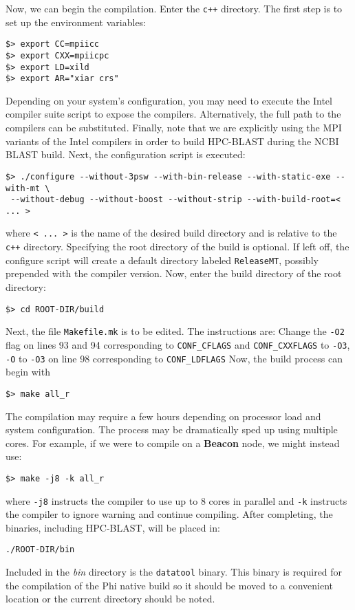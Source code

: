 \documentclass[10pt]{article}
\newcommand{\beac}{\textbf{Beacon }}
\begin{document}
\noindent Now, we can begin the compilation.  Enter the  \verb^c++^ directory.  The first step is to set up the environment variables:
\begin{verbatim}
$> export CC=mpiicc
$> export CXX=mpiicpc
$> export LD=xild
$> export AR="xiar crs" 
\end{verbatim}
\noindent Depending on your system's configuration, you may need to execute the Intel compiler suite script to expose the compilers.  Alternatively, the full path to the compilers can be substituted.  Finally, note that we are explicitly using the MPI variants
of the Intel compilers in order to build HPC-BLAST during the NCBI BLAST build.  Next, the configuration script is executed:
\begin{verbatim}
$> ./configure --without-3psw --with-bin-release --with-static-exe --with-mt \
 --without-debug --without-boost --without-strip --with-build-root=< ... >
\end{verbatim}
\noindent where \verb^< ... >^ is the name of the desired build directory and is relative to the \verb^c++^ directory.  Specifying the root directory of the build is optional.  If left off, the configure script will create a default directory labeled \verb^ReleaseMT^, possibly
prepended with the compiler version.  Now, enter the build directory of the root directory:
\begin{verbatim}
$> cd ROOT-DIR/build
\end{verbatim}
\noindent Next, the file \verb^Makefile.mk^ is to be edited. The instructions are:
Change the \verb^-O2^ flag on lines 93 and 94 corresponding to \verb^CONF_CFLAGS^ and \verb^CONF_CXXFLAGS^ to \verb^-O3^, \verb^-O^ to \verb^-O3^ on line 98 corresponding
to \verb^CONF_LDFLAGS^
\noindent Now, the build process can begin with
\begin{verbatim}
$> make all_r
\end{verbatim}
\noindent The compilation may require a few hours depending on processor load and system configuration.  The process may be dramatically sped up using multiple cores.  For example, if we were to compile on a \beac node, we might instead use:
\begin{verbatim}
$> make -j8 -k all_r 
\end{verbatim}
\noindent where \verb^-j8^ instructs the compiler to use up to 8 cores in parallel and \verb^-k^ instructs the compiler to ignore warning and continue compiling.  After completing, the binaries, including HPC-BLAST, will be placed in:
\begin{verbatim}
./ROOT-DIR/bin
\end{verbatim}
\noindent Included in the \emph{bin} directory is the \verb^datatool^ binary.  This binary is required for the compilation of the Phi native build so it should be moved to a convenient location or the current directory should be noted.
\end{document}
